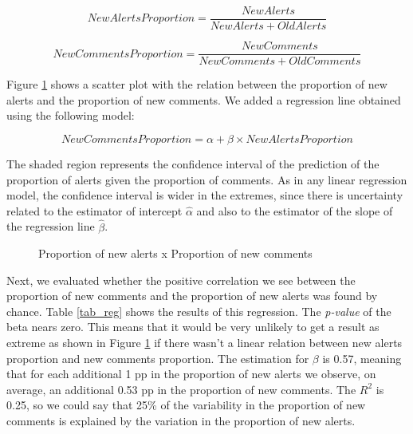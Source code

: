 \documentclass[
]{article}
\begin{document}
\[NewAlertsProportion = \frac{NewAlerts}{NewAlerts + OldAlerts}\]

\[NewCommentsProportion = \frac{NewComments}{NewComments + OldComments}\]

%
%

%
%

Figure \ref{scatter_prop} shows a scatter plot with the relation between the proportion of new alerts and the proportion of new comments. We added a regression line obtained using the following model:

\[ NewCommentsProportion = \alpha + \beta \times NewAlertsProportion \]

The shaded region represents the confidence interval of the prediction of the proportion of alerts given the proportion of comments. As in any linear regression model, the confidence interval is wider in the extremes, since there is uncertainty related to the estimator of intercept \(\hat{\alpha}\) and also to the estimator of the slope of the regression line \(\hat{\beta}\).

\begin{figure}
    \centering
    \caption{\label{scatter_prop}Proportion of new alerts x Proportion of
    new comments}
\end{figure}

Next, we evaluated whether the positive correlation we see between the proportion of new comments and the proportion of new alerts was found by chance. Table \ref{tab_reg} shows the results of this regression. The \textit{p-value} of the beta nears zero. This means that it would be very unlikely to get a result as extreme as shown in Figure \ref{scatter_prop} if there wasn't a linear relation between new alerts proportion and new comments proportion. The estimation for \(\beta\) is 0.57, meaning that for each additional 1 pp in the proportion of new alerts we observe, on average, an additional 0.53 pp in the proportion of new comments. The \(R^2\) is 0.25, so we could say that 25\% of the variability in the proportion of new comments is explained by the variation in the proportion of new alerts.
\end{document}
